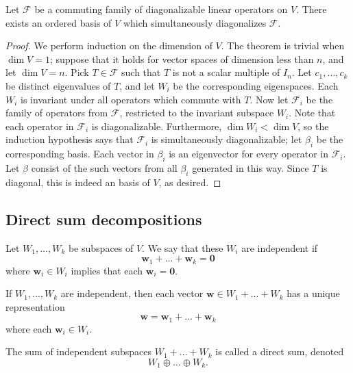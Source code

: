 \documentclass[11pt]{article}
\renewcommand{\vec}[1]{\boldsymbol{#1}}
\newcommand{\vw}{\vec{w}}
\newcommand{\alg}[1]{\mathscr{#1}}
\newcommand{\algF}{\alg{F}}
\newcommand{\dim}{\operatorname{dim}}
\theoremstyle{definition}
\theoremstyle{remark}
\numberwithin{equation}{section}
\begin{document}
    \begin{theorem}
        Let $\algF$ be a commuting family of diagonalizable linear operators on $V$.
        There exists an ordered basis of $V$ which simultaneously diagonalizes
        $\algF$.
    \end{theorem}
    \begin{proof}
        We perform induction on the dimension of $V$. The theorem is trivial when
        $\dim{V} = 1$; suppose that it holds for vector spaces of dimension less than
        $n$, and let $\dim{V} = n$. Pick $T \in \algF$ such that $T$ is not a scalar
        multiple of $I_n$. Let $c_1, \dots, c_k$ be distinct eigenvalues of $T$, and
        let $W_i$ be the corresponding eigenspaces. Each $W_i$ is invariant under all
        operators which commute with $T$. Now let $\algF_i$ be the family of
        operators from $\algF$, restricted to the invariant subspace $W_i$. Note that
        each operator in $\algF_i$ is diagonalizable. Furthermore, $\dim{W_i} <
        \dim{V}$, so the induction hypothesis says that $\algF_i$ is simultaneously
        diagonalizable; let $\beta_i$ be the corresponding basis. Each vector in
        $\beta_i$ is an eigenvector for every operator in $\algF_i$. Let $\beta$
        consist of the such vectors from all $\beta_i$ generated in this way. Since
        $T$ is diagonal, this is indeed an basis of $V$, as desired.
    \end{proof}

    \subsection{Direct sum decompositions}
    \begin{definition}
        Let $W_1, \dots, W_k$ be subspaces of $V$. We say that these $W_i$ are
        independent if \[
            \vw_1 + \dots + \vw_k = \vec{0}
        \] where $\vw_i \in W_i$ implies that each $\vw_i = \vec{0}$.
    \end{definition}

    \begin{lemma}
        If $W_1, \dots, W_k$ are independent, then each vector $\vw \in W_1 + ... +
        W_k$ has a unique representation \[
            \vw = \vw_1 + \dots + \vw_k
        \] where each $\vw_i \in W_i$.
    \end{lemma}

    \begin{definition}
        The sum of independent subspaces $W_1 + \dots + W_k$ is called a direct sum,
        denoted \[
            W_1 \oplus \dots \oplus W_k.
        \] 
    \end{definition}
\end{document}
